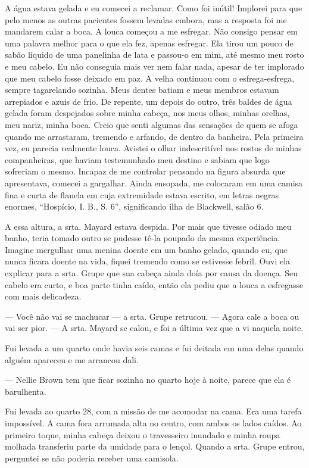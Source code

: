 A água estava gelada e eu comecei a reclamar. Como foi inútil! Implorei para
que pelo menos as outras pacientes fossem levadas embora, mas a resposta
foi me mandarem calar a boca. A louca começou a me esfregar. Não consigo
pensar em uma palavra melhor para o que ela fez, apenas esfregar. Ela
tirou um pouco de sabão líquido de uma panelinha de lata e passou-o em
mim, até mesmo meu rosto e meu cabelo. Eu não conseguia mais ver nem
falar nada, apesar de ter implorado que meu cabelo fosse deixado em paz.
A velha continuou com o esfrega-esfrega, sempre tagarelando sozinha.
Meus dentes batiam e meus membros estavam arrepiados e azuis de frio. De
repente, um depois do outro, três baldes de água gelada foram despejados
sobre minha cabeça, nos meus olhos, minhas orelhas, meu nariz, minha
boca. Creio que senti algumas das sensações de quem se afoga quando me
arrastaram, tremendo e arfando, de dentro da banheira. Pela primeira
vez, eu parecia realmente louca. Avistei o olhar indescritível nos
rostos de minhas companheiras, que haviam testemunhado meu destino e
sabiam que logo sofreriam o mesmo. Incapaz de me controlar pensando na
figura absurda que apresentava, comecei a gargalhar. Ainda ensopada, me
colocaram em uma camisa fina e curta de flanela em cuja extremidade
estava escrito, em letras negras enormes, ``Hospício, I. B., S. 6'',
significando ilha de Blackwell, salão 6.

A essa altura, a srta. Mayard estava despida. Por mais que tivesse
odiado meu banho, teria tomado outro se pudesse tê-la poupado da mesma
experiência. Imagine mergulhar uma menina doente em um banho gelado,
quando eu, que nunca ficara doente na vida, fiquei tremendo como se
estivesse febril. Ouvi ela explicar para a srta. Grupe que sua cabeça
ainda doía por causa da doença. Seu cabelo era curto, e boa parte tinha
caído, então ela pediu que a louca a esfregasse com mais delicadeza.

--- Você não vai se machucar --- a srta. Grupe retrucou. --- Agora cale
a boca ou vai ser pior. --- A srta. Mayard se calou, e foi a última vez
que a vi naquela noite.

Fui levada a um quarto onde havia seis camas e fui deitada em uma delas
quando alguém apareceu e me arrancou dali.

--- Nellie Brown tem que ficar sozinha no quarto hoje à noite, parece
que ela é barulhenta.

Fui levada ao quarto 28, com a missão de me acomodar na cama. Era uma
tarefa impossível. A cama fora arrumada alta no centro, com ambos os
lados caídos. Ao primeiro toque, minha cabeça deixou o travesseiro
inundado e minha roupa molhada transferiu parte da umidade para o
lençol. Quando a srta. Grupe entrou, perguntei se não poderia receber
uma camisola.

